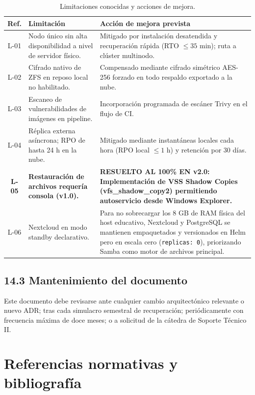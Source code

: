 \documentclass[10pt,a4paper]{article}
\begin{document}
\begin{table}[htbp]
\centering
\small
\caption{Limitaciones conocidas y acciones de mejora.}
\label{tab:limitaciones}
\begin{tabular}{|c|p{5cm}|p{8.5cm}|}
\hline
\textbf{\textsf{Ref.}} & \textbf{\textsf{Limitación}} & \textbf{\textsf{Acción de mejora prevista}} \\
\hline
L-01 & Nodo único sin alta disponibilidad a nivel de servidor físico. & Mitigado por instalación desatendida y recuperación rápida (RTO $\le 35$ min); ruta a clúster multinodo. \\
\hline
L-02 & Cifrado nativo de ZFS en reposo local no habilitado. & Compensado mediante cifrado simétrico AES-256 forzado en todo respaldo exportado a la nube. \\
\hline
L-03 & Escaneo de vulnerabilidades de imágenes en pipeline. & Incorporación programada de escáner Trivy en el flujo de CI. \\
\hline
L-04 & Réplica externa asíncrona; RPO de hasta 24 h en la nube. & Mitigado mediante instantáneas locales cada hora (RPO local $\le 1$ h) y retención por 30 días. \\
\hline
\textbf{L-05} & \textbf{Restauración de archivos requería consola (v1.0).} & \textbf{RESUELTO AL 100\% EN v2.0: Implementación de VSS Shadow Copies (vfs\_shadow\_copy2) permitiendo autoservicio desde Windows Explorer.} \\
\hline
L-06 & Nextcloud en modo standby declarativo. & Para no sobrecargar los 8 GB de RAM física del host educativo, Nextcloud y PostgreSQL se mantienen empaquetados y versionados en Helm pero en escala cero (\texttt{replicas: 0}), priorizando Samba como motor de archivos principal. \\
\hline
\end{tabular}
\end{table}

\subsection{14.3 Mantenimiento del documento}
Este documento debe revisarse ante cualquier cambio arquitectónico relevante o nuevo ADR; tras cada simulacro semestral de recuperación; periódicamente con frecuencia máxima de doce meses; o a solicitud de la cátedra de Soporte Técnico II.

\newpage
\appendix
\section{Referencias normativas y bibliografía}
\end{document}
